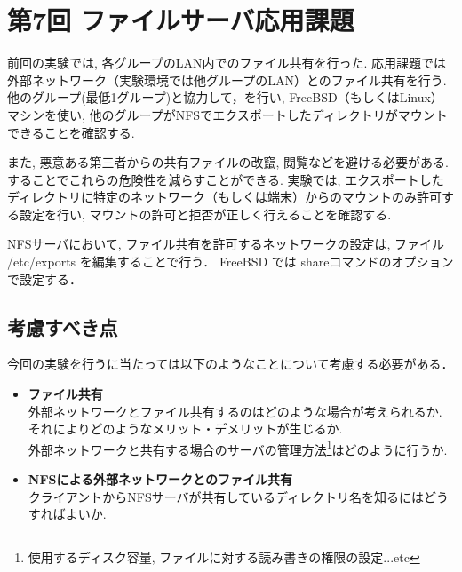 \section{第7回 ファイルサーバ応用課題}
前回の実験では, 各グループのLAN内でのファイル共有を行った.
応用課題では外部ネットワーク（実験環境では他グループのLAN）とのファイル共有を行う.
他のグループ(最低1グループ)と協力して，\textbf{}を行い, 
FreeBSD（もしくはLinux）マシンを使い, 他のグループがNFSでエクスポートしたディレクトリがマウントできることを確認する.

また, 悪意ある第三者からの共有ファイルの改竄, 閲覧などを避ける必要がある.
\textbf{}することでこれらの危険性を減らすことができる.
実験では, エクスポートしたディレクトリに特定のネットワーク（もしくは端末）からのマウントのみ許可する設定を行い, マウントの許可と拒否が正しく行えることを確認する.

NFSサーバにおいて, ファイル共有を許可するネットワークの設定は, ファイル /etc/exports を編集することで行う．
FreeBSD では shareコマンドのオプションで設定する．

\subsection*{考慮すべき点}
今回の実験を行うに当たっては以下のようなことについて考慮する必要がある．
\begin{itemize}

\item \textbf{ファイル共有}\\
外部ネットワークとファイル共有するのはどのような場合が考えられるか.\\
それによりどのようなメリット・デメリットが生じるか.\\
外部ネットワークと共有する場合のサーバの管理方法\footnote{使用するディスク容量, ファイルに対する読み書きの権限の設定...etc}はどのように行うか.\\

\item \textbf{NFSによる外部ネットワークとのファイル共有}\\
クライアントからNFSサーバが共有しているディレクトリ名を知るにはどうすればよいか.

\end{itemize}
